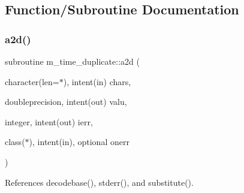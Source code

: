 \subsection{Function/\+Subroutine Documentation}
\mbox{\label{namespacem__time__duplicate_ab86bb390cc56184faeef5543735eecc4}} 
\subsubsection{\texorpdfstring{a2d()}{a2d()}}
{\footnotesize\ttfamily subroutine m\+\_\+time\+\_\+duplicate\+::a2d (\begin{DoxyParamCaption}\item[{character(len=$\ast$), intent(in)}]{chars,  }\item[{doubleprecision, intent(out)}]{valu,  }\item[{integer, intent(out)}]{ierr,  }\item[{class($\ast$), intent(in), optional}]{onerr }\end{DoxyParamCaption})}



References decodebase(), stderr(), and substitute().

